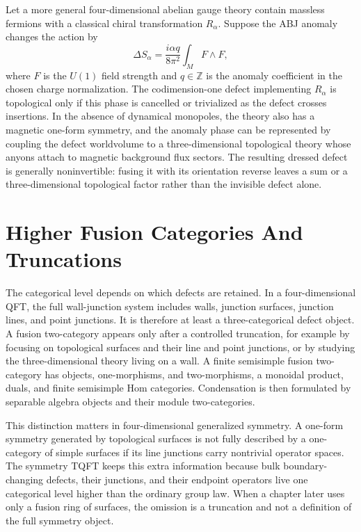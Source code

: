 Let a more general four-dimensional abelian gauge theory contain massless
fermions with a classical chiral transformation \(R_\alpha\).  Suppose the ABJ
anomaly changes the action by
\[
  \Delta S_\alpha
  =
  \frac{i\alpha q}{8\pi^2}\int_M F\wedge F ,
\]
where \(F\) is the \(U(1)\) field strength and \(q\in\mathbb Z\) is the anomaly
coefficient in the chosen charge normalization.  The codimension-one defect
implementing \(R_\alpha\) is topological only if this phase is cancelled or
trivialized as the defect crosses insertions.  In the absence of dynamical
monopoles, the theory also has a magnetic one-form symmetry, and the anomaly
phase can be represented by coupling the defect worldvolume to a
three-dimensional topological theory whose anyons attach to magnetic
background flux sectors.  The resulting dressed defect is generally
noninvertible: fusing it with its orientation reverse leaves a sum or a
three-dimensional topological factor rather than the invisible defect alone.

\section{Higher Fusion Categories And Truncations}
\label{sec:higher-fusion-categories-truncations}

The categorical level depends on which defects are retained.  In a
four-dimensional QFT, the full wall-junction system includes walls, junction
surfaces, junction lines, and point junctions.  It is therefore at least a
three-categorical defect object.  A fusion two-category appears only after a
controlled truncation, for example by focusing on topological surfaces and
their line and point junctions, or by studying the three-dimensional theory
living on a wall.  A finite semisimple fusion two-category has objects,
one-morphisms, and two-morphisms, a monoidal product, duals, and finite
semisimple Hom categories.  Condensation is then formulated by separable
algebra objects and their module two-categories.

This distinction matters in four-dimensional generalized symmetry.  A
one-form symmetry generated by topological surfaces is not fully described by
a one-category of simple surfaces if its line junctions carry nontrivial
operator spaces.  The symmetry TQFT keeps this extra information because bulk
boundary-changing defects, their junctions, and their endpoint operators live
one categorical level higher than the ordinary group law.  When a chapter later
uses only a fusion ring of surfaces, the omission is a truncation and not a
definition of the full symmetry object.

